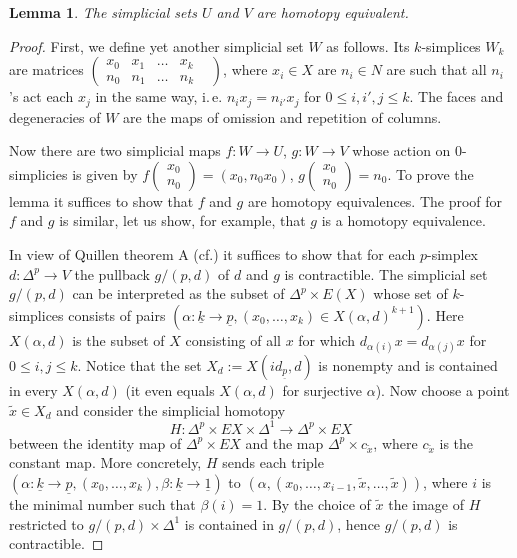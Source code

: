 \documentclass[oneside, 10pt]{amsart}
\theoremstyle{plain}
\numberwithin{equation}{section}
\newtheorem{lemma}{Lemma}
\numberwithin{lemma}{section}
\theoremstyle{remark}
\theoremstyle{definition}
\begin{document}
\begin{lemma} \label{lm:quillen-a} The simplicial sets $U$ and $V$ are homotopy equivalent. \end{lemma}
\begin{proof} First, we define yet another simplicial set $W$ as follows.
Its $k$-simplices $W_k$ are matrices $\left(\begin{smallmatrix}x_0 & x_1 & \ldots & x_k&\\ n_0 & n_1 & \ldots & n_k \end{smallmatrix}\right)$,
 where $x_i\in X$ are $n_i\in N$ are such that all $n_i$'s act each $x_j$ in the same way, i.\,e. $n_ix_j = n_{i'} x_j$ for $0\leq i,i',j\leq k$. 
 The faces and degeneracies of $W$ are the maps of omission and repetition of columns.
 
 Now there are two simplicial maps $f\colon W\to U$, $g\colon W\to V$ whose action on $0$-simplicies is given by 
  $f\left(\begin{smallmatrix}x_0 \\ n_0\end{smallmatrix}\right) = (x_0, n_0x_0)$, 
  $g\left(\begin{smallmatrix}x_0 \\ n_0\end{smallmatrix}\right) = n_0$. 
 To prove the lemma it suffices to show that $f$ and $g$ are homotopy equivalences. 
 The proof for $f$ and $g$ is similar, let us show, for example, that $g$ is a homotopy equivalence.
 
 In view of Quillen theorem A (cf.\cite[ex.~IV.3.11]{Kbook}) it suffices to show that for each $p$-simplex $d \colon \Delta^p \to V$ the 
  pullback $g/(p, d)$ of $d$ and $g$ is contractible.
 The simplicial set $g/(p, d)$ can be interpreted as the subset of $\Delta^p \times E(X)$ whose set of $k$-simplices consists of pairs
  $(\alpha\colon \underline{k}\to \underline{p}, (x_0, \ldots, x_k)\in X(\alpha, d)^{k+1})$.
 Here $X(\alpha, d)$ is the subset of $X$ consisting of all $x$ for which $d_{\alpha(i)}x = d_{\alpha(j)}x$ for $0\leq i,j\leq k$.
 Notice that the set $X_d := X(id_{\underline{p}}, d)$ is nonempty and is contained in every $X(\alpha, d)$ (it even equals $X(\alpha, d)$ for surjective $\alpha$).
 Now choose a point $\widetilde{x}\in X_d$ and consider the simplicial homotopy \[H\colon \Delta^p \times EX \times \Delta^1 \to \Delta^p\times EX\] 
  between the identity map of $\Delta^p \times EX$ and
 the map $\Delta^p \times c_{\widetilde{x}}$, where $c_{\widetilde{x}}$ is the constant map. 
 More concretely, $H$ sends each triple $(\alpha\colon \underline{k} \to \underline{p}, (x_0, \ldots, x_k), \beta\colon \underline{k}\to\underline{1})$
 to $(\alpha, (x_0, \ldots, x_{i-1}, \widetilde{x}, \ldots, \widetilde{x}))$, where $i$ is the minimal number such that $\beta(i)=1$.
 By the choice of $\widetilde{x}$ the image of $H$ restricted to $g/(p, d)\times \Delta^1$ is contained in $g/(p, d)$, hence $g/(p, d)$ is contractible. 
\end{proof}
\end{document}
